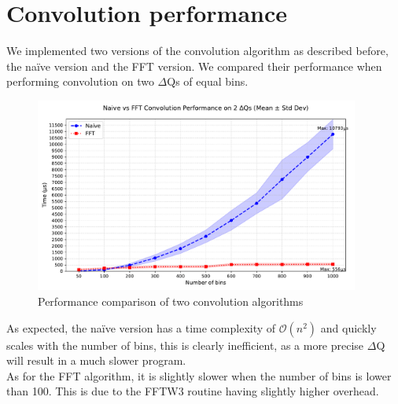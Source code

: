 \section{Convolution performance}
    We implemented two versions of the convolution algorithm as described before, the naïve version and the FFT version. We compared their performance when performing convolution on two $\Delta$Qs of equal bins.
    \begin{figure}[H]
        \begin{center}
            \includegraphics[width=0.95\textwidth, scale = 0.8]{img/conv_perf.pdf}
        \end{center}
        \caption{Performance comparison of two convolution algorithms}\label{fig:conv_perf}
    \end{figure}

    As expected, the naïve version has a time complexity of $\mathcal{O}(n^2)$ and quickly scales with the number of bins, this is clearly inefficient, as a more precise $\Delta$Q will result in a much slower program. \\
As for the FFT algorithm, it is slightly slower when the number of bins is lower than 100. This is due to the FFTW3 routine having slightly higher overhead.

